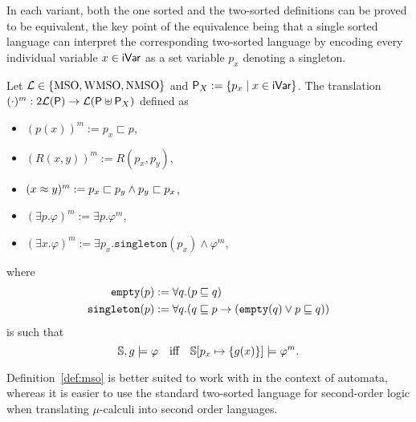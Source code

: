 In each variant, both the one sorted and the two-sorted definitions can be proved to be equivalent, the key point of the equivalence being that a single sorted language can interpret the corresponding two-sorted language by encoding every individual variable $x \in \mathsf{iVar}$ as a set variable $p_x$ denoting a singleton.

\begin{fact}\label{fact:msovs2mso}
Let $\mathcal{L} \in \{\mathrm{MSO}, \mathrm{WMSO}, \mathrm{NMSO}\}$ and $\mathsf{P}_X:=\{p_x\mid x \in \mathsf{iVar}\}$.
The translation $(\cdot)^{m} : 2\mathcal{L}(\mathsf{P}) \to \mathcal{L}(\mathsf{P} \uplus \mathsf{P}_X)$ defined as
\begin{itemize}
\item $(p(x))^m:= p_x \sqsubset p$,
\item $(R(x,y))^m:=R(p_x, p_y)$,
\item $ (x \approx y)^m:=  p_x \sqsubset p_y \land p_y \sqsubset p_x$,
\item $(\exists p. \varphi)^m := \exists p. \varphi^m$,
\item $(\exists x. \varphi)^m:= \exists p_x. \texttt{singleton}(p_x) \land \varphi^m$,
\end{itemize}
where  
\begin{align*}
  \texttt{empty}(p) & := \forall q. (p \sqsubseteq q) \\
  \texttt{singleton}(p) & := \forall q. (q \sqsubseteq p \to (\texttt{empty}(q) \lor p\sqsubseteq q))
\end{align*}
is such that
  \[
  \model,\ass \models \varphi \quad\text{iff}\quad \model[p_{x} \mapsto \{\ass(x)\}] \models \varphi^m.
  \]
\end{fact}

Definition~\ref{def:mso} is better suited to work with in the context of automata, whereas it is easier to use the standard two-sorted language for second-order logic when translating $\mu$-calculi into second order languages.
